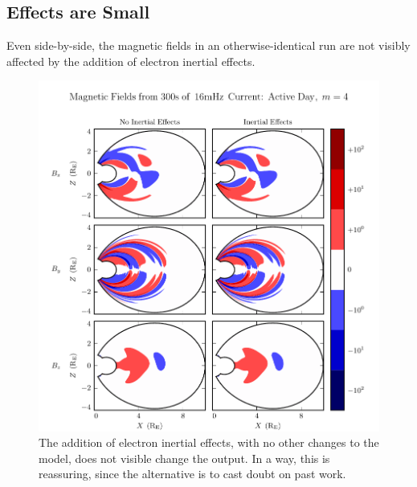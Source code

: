 

\subsection{Effects are Small}

Even side-by-side, the magnetic fields in an otherwise-identical run are not visibly affected by the addition of electron inertial effects. 

\begin{figure}[H]
    \centering
    \includegraphics[width=\textwidth]{figures/B_1_004_016mHz.pdf}
    \caption[Magnetic Fields With and Without Electron Inertia]{
      The addition of electron inertial effects, with no other changes to the model, does not visible change the output. In a way, this is reassuring, since the alternative is to cast doubt on past work. 
    }
    \label{fig_B_1_004_016mHz}
\end{figure}

